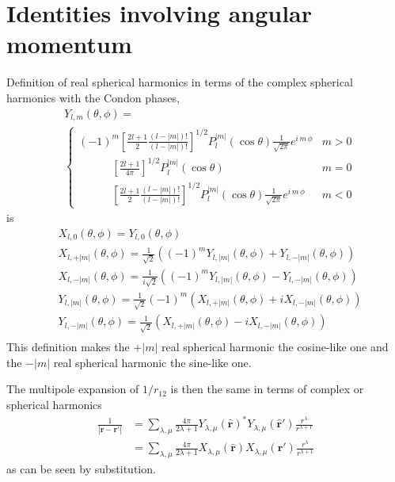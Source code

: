 \documentclass[%
pra%
,twocolumn%
,amssymb, nobibnotes, aps,
longbibliography
]{revtex4-1}
\begin{document}
\section{Identities involving angular momentum}
\label{sec:angmom}
Definition of real spherical harmonics in terms of the complex spherical harmonics with the Condon phases,
\begin{equation}
\begin{split}
&Y_{l,m}(\theta,\phi) =\\
&\begin{cases} (-1)^m  \left[ \frac{2l+1}{2} \frac{(l-|m|)!}{(l-|m|)!} \right]^{1/2} P_l^{|m|}(\cos \theta) \frac{1}{\sqrt{2\pi}} e^{i\, m \, \phi} & m>0 \\ 
\qquad \quad   \left[ \frac{2l+1}{4 \pi}  \right]^{1/2} P_l^{|m|}(\cos \theta)  & m=0 \\
\qquad \quad   \left[ \frac{2l+1}{2} \frac{(l-|m|)!}{(l-|m|)!} \right]^{1/2} P_l^{|m|}(\cos \theta)   \frac{1}{\sqrt{2\pi}} e^{i\, m \, \phi} & m < 0
\end{cases}
\end{split}
\end{equation}
is
\begin{equation}
\begin{split}
&X_{l,0}(\theta,\phi) = Y_{l,0}(\theta,\phi) \\
&X_{l,+|m|}(\theta,\phi) = \frac{1}{\sqrt{2}} \left((-1)^mY_{l,|m|}(\theta,\phi) + Y_{l,-|m|}(\theta,\phi) \right)\\
&X_{l,-|m|}(\theta,\phi) = \frac{1}{i\sqrt{2}} \left((-1)^mY_{l,|m|}(\theta,\phi) -Y_{l,-|m|}(\theta,\phi) \right)\\
& Y_{l,|m|}(\theta,\phi) = \frac{1}{\sqrt{2}} (-1)^m (X_{l,+|m|}(\theta,\phi)+i X_{l,-|m|}(\theta,\phi)) \\
& Y_{l,-|m|}(\theta,\phi) = \frac{1}{\sqrt{2}}  (X_{l,+|m|}(\theta,\phi)-iX_{l,-|m|}(\theta,\phi)) \\
\end{split}
\end{equation}
This definition makes the $+|m|$ real spherical harmonic the cosine-like one and the $-|m|$ real spherical harmonic the sine-like one.

The multipole expansion of $1/r_{12}$ is then the same in terms of complex or spherical harmonics 
\begin{equation}
\begin{split}
\frac{1}{| \mathbf{r}- \mathbf{r}'|} &= 
 \sum_{\lambda,\mu} \frac{4 \pi}{2\lambda +1}
Y_{\lambda,\mu}(\mathbf{\hat{r}})^*
Y_{\lambda,\mu}(\mathbf{\hat{r}}')
\frac{r^\lambda}{r^{\lambda+1}} \\
&= 
 \sum_{\lambda,\mu} \frac{4 \pi}{2\lambda +1}
X_{\lambda,\mu}(\mathbf{\hat{r}})
X_{\lambda,\mu}(\mathbf{\hat{r}}')
\frac{r^\lambda}{r^{\lambda+1}} 
\end{split}
\end{equation}
as can be seen by substitution.
\end{document}
